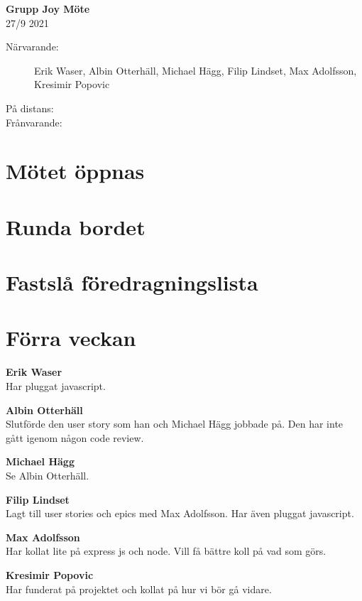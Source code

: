 \documentclass[9pt]{article}
\newcommand{\Waser}{Erik Waser\xspace}
\newcommand{\Slaget}{Albin Otterhäll\xspace}
\newcommand{\Max}{Max Adolfsson\xspace}
\newcommand{\Kim}{Michael Hägg\xspace}
\newcommand{\Algen}{Filip Lindset\xspace}
\newcommand{\Kres}{Kresimir Popovic\xspace}
\newcommand{\datum}{27/9 2021} %
\begin{document}
\begin{center}
    \Large{\textbf{Grupp Joy Möte}}\\
    \normalsize
    \datum \\ %
\end{center}

\begin{description} %
  \item [Närvarande:] \Waser, \Slaget, \Kim, \Algen, \Max, \\ \Kres
  \item [På distans:]
  \item [Frånvarande:] 

\end{description}

\section{Mötet öppnas}

\section{Runda bordet}

\section{Fastslå föredragningslista}

\section{Förra veckan}
\textbf{\Waser}\\ Har pluggat javascript.

\textbf{\Slaget}\\ Slutförde den user story som han och \Kim jobbade på. Den har inte gått igenom någon code review.

\textbf{\Kim}\\ Se \Slaget.

\textbf{\Algen}\\ Lagt till user stories och epics med \Max. Har även pluggat javascript. 

\textbf{\Max}\\ Har kollat lite på express js och node. Vill få bättre koll på vad som görs. 

\textbf{\Kres}\\ Har funderat på projektet och kollat på hur vi bör gå vidare. 
\end{document}
